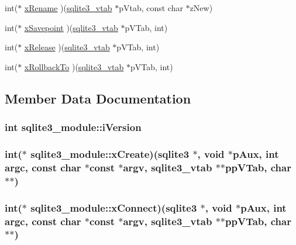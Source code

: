 \begin{CompactItemize}
\item 
int($\ast$ \hyperlink{structsqlite3__module_f886782e9a1ea5c4b131b2bc373c8092}{xRename} )(\hyperlink{structsqlite3__vtab}{sqlite3\_\-vtab} $\ast$pVtab, const char $\ast$zNew)
\item 
int($\ast$ \hyperlink{structsqlite3__module_f90f1df803fce1b90048864aeeeee890}{xSavepoint} )(\hyperlink{structsqlite3__vtab}{sqlite3\_\-vtab} $\ast$pVTab, int)
\item 
int($\ast$ \hyperlink{structsqlite3__module_8dcaa6dc6d9563c8da57e4c8c5055609}{xRelease} )(\hyperlink{structsqlite3__vtab}{sqlite3\_\-vtab} $\ast$pVTab, int)
\item 
int($\ast$ \hyperlink{structsqlite3__module_767753c6c97d1f622e5113367a0547b5}{xRollbackTo} )(\hyperlink{structsqlite3__vtab}{sqlite3\_\-vtab} $\ast$pVTab, int)
\end{CompactItemize}


\subsection{Member Data Documentation}
\hypertarget{structsqlite3__module_42b11d080dc205aea43581b18f925afe}{
\subsubsection[iVersion]{\setlength{\rightskip}{0pt plus 5cm}int {\bf sqlite3\_\-module::iVersion}}}
\label{structsqlite3__module_42b11d080dc205aea43581b18f925afe}


\hypertarget{structsqlite3__module_95e327c9d32abd731013395d9e12b8f9}{
\subsubsection[xCreate]{\setlength{\rightskip}{0pt plus 5cm}int($\ast$ {\bf sqlite3\_\-module::xCreate})({\bf sqlite3} $\ast$, void $\ast$pAux, int argc, const char $\ast$const $\ast$argv, {\bf sqlite3\_\-vtab} $\ast$$\ast$ppVTab, char $\ast$$\ast$)}}
\label{structsqlite3__module_95e327c9d32abd731013395d9e12b8f9}


\hypertarget{structsqlite3__module_cdd9ccc4a6acff230b2d579172ae32d0}{
\subsubsection[xConnect]{\setlength{\rightskip}{0pt plus 5cm}int($\ast$ {\bf sqlite3\_\-module::xConnect})({\bf sqlite3} $\ast$, void $\ast$pAux, int argc, const char $\ast$const $\ast$argv, {\bf sqlite3\_\-vtab} $\ast$$\ast$ppVTab, char $\ast$$\ast$)}}
\label{structsqlite3__module_cdd9ccc4a6acff230b2d579172ae32d0}


